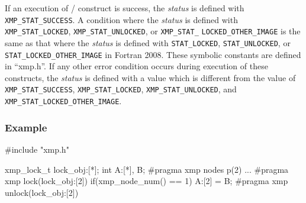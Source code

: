 If an execution of {\tt {}}/{\tt {}} construct is success,
the {\it status} is defined with {\tt XMP\_STAT\_SUCCESS}.
A condition where the {\it status} is defined with 
{\tt XMP\_STAT\_LOCKED}, {\tt XMP\_STAT\_UNLOCKED}, or {\tt XMP\_STAT\_}
{\tt LOCKED\_OTHER\_IMAGE} 
is the same as that where the {\it status} is defined with
{\tt STAT\_LOCKED}, {\tt STAT\_UNLOCKED}, or {\tt STAT\_LOCKED\_OTHER\_IMAGE} in Fortran 2008.
These symbolic constants are defined in ``xmp.h''.
If any other error condition occurs during execution of these constructs,
the {\it status} is defined with a value which is different from the
value of {\tt XMP\_STAT\_SUCCESS}, {\tt XMP\_STAT\_LOCKED}, 
{\tt XMP\_STAT\_UNLOCKED}, and {\tt XMP\_STAT\_LOCKED\_OTHER\_IMAGE}.


\subsubsection*{Example}
\begin{XCexample}
#include "xmp.h"

xmp_lock_t lock_obj:[*];
int A:[*], B;
#pragma xmp nodes p(2)
...
#pragma xmp lock(lock_obj:[2])
  if(xmp_node_num() == 1){
    A:[2] = B;
  }
#pragma xmp unlock(lock_obj:[2])
\end{XCexample}


